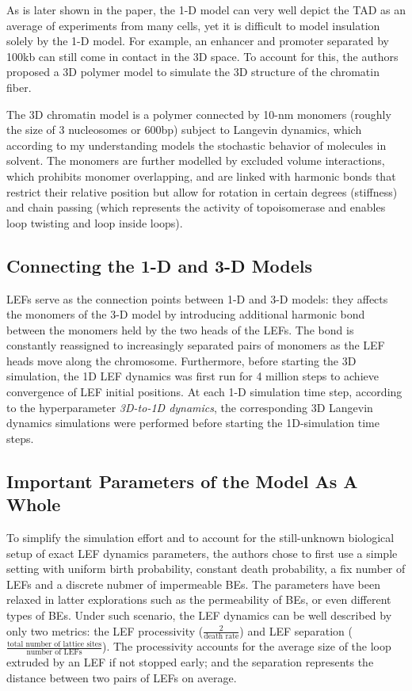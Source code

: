 \documentclass[11pt]{article}
\begin{document}
As is later shown in the paper, the 1-D model can very well depict the TAD as an average of experiments from many cells, yet it is difficult to model insulation solely by the 1-D model. For example, an enhancer and promoter separated by 100kb can still come in contact in the 3D space. To account for this, the authors proposed a 3D polymer model to simulate the 3D structure of the chromatin fiber.

The 3D chromatin model is a polymer connected by 10-nm monomers (roughly the size of 3 nucleosomes or 600bp) subject to Langevin dynamics, which according to my understanding models the stochastic behavior of molecules in solvent. The monomers are further modelled by excluded volume interactions, which prohibits monomer overlapping, and are linked with harmonic bonds that restrict their relative position but allow for rotation in certain degrees (stiffness) and chain passing (which represents the activity of topoisomerase and enables loop twisting and loop inside loops).

\subsection{Connecting the 1-D and 3-D Models}

LEFs serve as the connection points between 1-D and 3-D models: they affects the monomers of the 3-D model by introducing additional harmonic bond between the monomers held by the two heads of the LEFs. The bond is constantly reassigned to increasingly separated pairs of monomers as the LEF heads move along the chromosome. Furthermore, before starting the 3D simulation, the 1D LEF dynamics was first run for 4 million steps to achieve convergence of LEF initial positions. At each 1-D simulation time step, according to the hyperparameter \textit{3D-to-1D dynamics}, the corresponding 3D Langevin dynamics simulations were performed before starting the 1D-simulation time steps.

\subsection{Important Parameters of the Model As A Whole}

To simplify the simulation effort and to account for the still-unknown biological setup of exact LEF dynamics parameters, the authors chose to first use a simple setting with uniform birth probability, constant death probability, a fix number of LEFs and a discrete nubmer of impermeable BEs. The parameters have been relaxed in latter explorations such as the permeability of BEs, or even different types of BEs. Under such scenario, the LEF dynamics can be well described by only two metrics: the LEF processivity ($\frac{2}{\text{death rate}}$) and LEF separation ($\frac{\text{total number of lattice sites}}{\text{number of LEFs}}$). The processivity accounts for the average size of the loop extruded by an LEF if not stopped early; and the separation represents the distance between two pairs of LEFs on average.
\end{document}
